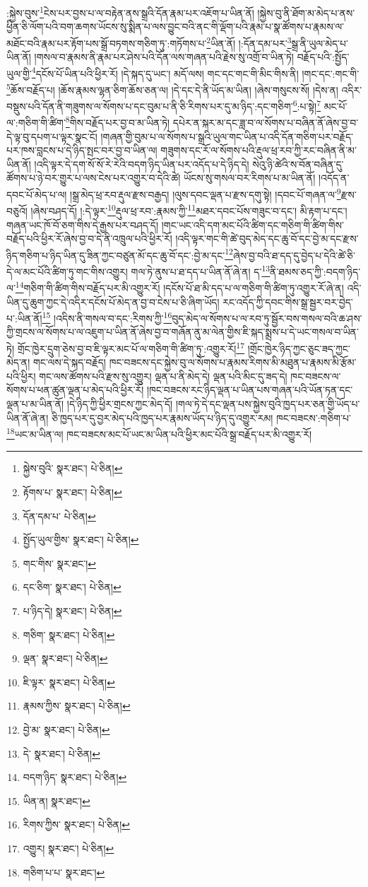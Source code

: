 :སྐྱེས་བུས་\footnote{སྐྱེས་བུའི་  སྣར་ཐང་།  པེ་ཅིན། }ངེས་པར་བྱས་པ་ལ་བརྟེན་ནས་སྒྲའི་དོན་རྣམ་པར་འཇོག་པ་ཡིན་ནོ། །སྐྱེས་བུ་ནི་ཐོག་མ་མེད་པ་ནས་ཕྱིན་ཅི་ལོག་པའི་བག་ཆགས་ཡོངས་སུ་སྨིན་པ་ལས་བྱུང་བའི་ནང་གི་ལྡོག་པའི་རྣམ་པ་སྣ་ཚོགས་པ་རྣམས་ལ་མཐོང་བའི་རྣམ་པར་རྟོག་པས་སྒྲོ་བཏགས་གཅིག་ཏུ་:གཏོགས་པ་\footnote{རྟོགས་པ་  སྣར་ཐང་།  པེ་ཅིན། }ཡིན་ནོ། །:དོན་དམ་པར་\footnote{དོན་དམ་པ་  པེ་ཅིན། }སྒྲ་ནི་ཡུལ་མེད་པ་ཡིན་ནོ། །གསལ་བ་རྣམས་ནི་རྣམ་པར་ཤེས་པའི་དོན་ལས་གཞན་པའི་རྗེས་སུ་འགྲོ་བ་ཡིན་ཏེ། བརྗོད་པའི་:སྤྱོད་ཡུལ་གྱི་\footnote{སྤྱོད་ཡུལ་གྱིས་  སྣར་ཐང་།  པེ་ཅིན། }དངོས་པོ་ཡིན་པའི་ཕྱིར་རོ། །དེ་སྐད་དུ་ཡང་། མདོ་ལས། གང་དང་གང་གི་མིང་གིས་ནི། །གང་དང་:གང་གི་\footnote{གང་གིས་  སྣར་ཐང་། }ཆོས་བརྗོད་པ། །ཆོས་རྣམས་ལྷན་ཅིག་ཆོས་ཅན་ལ། །དེ་དང་དེ་ནི་ཡོད་མ་ཡིན། །ཞེས་གསུངས་སོ། །དེས་ན། འདིར་བསྡུས་པའི་དོན་ནི་གཟུགས་ལ་སོགས་པ་དང་བུམ་པ་ནི་ཅི་རིགས་པར་དུ་མ་ཉིད་:དང་གཅིག་\footnote{དང་ཅིག་  སྣར་ཐང་།  པེ་ཅིན། }:པ་སྟེ།\footnote{པ་ཉིད་དེ།  སྣར་ཐང་།  པེ་ཅིན། } མང་པོ་ལ་:གཅིག་གི་ཚིག་\footnote{གཅིག་  སྣར་ཐང་།  པེ་ཅིན། }གིས་བརྗོད་པར་བྱ་བ་མ་ཡིན་ཏེ། དཔེར་ན་སྐར་མ་དང་ཟླ་བ་ལ་སོགས་པ་བཞིན་ནོ་ཞེས་བྱ་བ་དེ་ལྟ་བུ་དཔག་པ་ལྟར་སྣང་ངོ། །གཞན་གྱི་བུམ་པ་ལ་སོགས་པ་སྒྲའི་ཡུལ་གང་ཡིན་པ་འདི་དོན་གཅིག་པར་བརྗོད་པར་ཁས་བླངས་པ་དེ་ཉིད་སྤང་བར་བྱ་བ་ཡིན་ལ། གཟུགས་དང་རོ་ལ་སོགས་པའི་རྡུལ་ཕྲ་རབ་ཀྱི་རང་བཞིན་ནི་མ་ཡིན་ནོ། །འདི་ལྟར་དེ་དག་སོ་སོ་རེ་རེའི་བདག་ཉིད་ཡིན་པར་འདོད་པ་དེ་ཉིད་དེ། སེའུ་ཉི་ཚེའི་ས་བོན་བཞིན་དུ་ཚོགས་པ་ཉེ་བར་གྱུར་པ་ལས་ངེས་པར་འགྱུར་བ་དེའི་ཚེ། ཡོངས་སུ་གསལ་བར་རིགས་པ་མ་ཡིན་ནོ། །འདོད་ན་དབང་པོ་མེད་པ་ལ། །སྒྲ་མེད་ཕྲ་རབ་རྡུལ་རྫས་བརྒྱད། །ལུས་དབང་ལྡན་པ་རྫས་དགུ་སྟེ། །དབང་པོ་གཞན་ལ་\footnote{ལྡན་  སྣར་ཐང་།  པེ་ཅིན། }རྫས་བཅུའོ། །ཞེས་བཤད་དོ། །:དེ་ལྟར་\footnote{ཇི་ལྟར་  སྣར་ཐང་།  པེ་ཅིན། }རྡུལ་ཕྲ་རབ་:རྣམས་ཀྱི་\footnote{རྣམས་ཀྱིས་  སྣར་ཐང་།  པེ་ཅིན། }མཐར་དབང་པོས་གཟུང་བ་དང་། མི་རྟག་པ་དང་། གཞན་ཡང་ཁོ་བོ་ཅག་གིས་དེ་རྒྱས་པར་བཤད་དོ། །གང་ཡང་འདི་དག་མང་པོའི་ཚིག་དང་གཅིག་གི་ཚིག་གིས་བརྗོད་པའི་ཕྱིར་རོ་ཞེས་བྱ་བ་དེ་ནི་འཁྲུལ་པའི་ཕྱིར་རོ། །འདི་ལྟར་གང་གི་ཚེ་བུད་མེད་དང་ཆུ་བོ་དང་བྱེ་མ་དང་རྫས་ཉིད་གཅིག་པ་ཉིད་ཡིན་དུ་ཟིན་ཀྱང་བཙུན་མོ་དང་ཆུ་བོ་དང་:བྱེ་མ་དང་\footnote{བྱེ་མ་  སྣར་ཐང་།  པེ་ཅིན། }ཞེས་བྱ་བའི་ཐ་དད་དུ་བྱེད་པ་དེའི་ཚེ་ཅི་དེ་ལ་མང་པོའི་ཚིག་ཏུ་གང་གིས་འགྱུར། གལ་ཏེ་ནུས་པ་ཐ་དད་པ་ཡིན་ནོ་ཞེ་ན། ད་\footnote{དེ་  སྣར་ཐང་།  པེ་ཅིན། }ནི་ཐམས་ཅད་ཀྱི་:བདག་ཉིད་ལ་\footnote{བདག་ཉིད་  སྣར་ཐང་།  པེ་ཅིན། }གཅིག་གི་ཚིག་གིས་བརྗོད་པར་མི་འགྱུར་རོ། །དངོས་པོ་ཐ་མི་དད་པ་ལ་གཅིག་གི་ཚིག་ཏུ་འགྱུར་རོ་ཞེ་ན། འདི་ཡིན་དུ་ཆུག་ཀྱང་དེ་འདིར་དངོས་པོ་མེད་ན་བྱ་བ་ངེས་པ་ཅི་ཞིག་ཡོད། རང་འདོད་ཀྱི་དབང་གིས་སྒྲ་སྦྱར་བར་བྱེད་པ་:ཡིན་ནོ།\footnote{ཡིན་ན།  སྣར་ཐང་། } །འདིས་ནི་གསལ་བ་དང་:རིགས་ཀྱི་\footnote{རིགས་ཀྱིས་  སྣར་ཐང་།  པེ་ཅིན། }བུད་མེད་ལ་སོགས་པ་ལ་རབ་ཏུ་སྦྱོར་བས་གསལ་བའི་ཆ་ཤས་ཀྱི་གྲངས་ལ་སོགས་པ་ལ་འཇུག་པ་ཡིན་ནོ་ཞེས་བྱ་བ་གཞོན་ནུ་མ་ལེན་གྱིས་ཇི་སྐད་སྨྲས་པ་དེ་ཡང་གསལ་བ་ཡིན་ཏེ། གྲོང་ཁྱེར་དྲུག་ཅེས་བྱ་བ་ཇི་ལྟར་མང་པོ་ལ་གཅིག་གི་ཚིག་ཏུ་:འགྱུར་རོ།\footnote{འགྱུར།  སྣར་ཐང་།  པེ་ཅིན། } །གྲོང་ཁྱེར་ཉིད་ཀྱང་ཅུང་ཟད་ཀྱང་མེད་ན། གང་ལས་དེ་སྐད་བརྗོད། ཁང་བཟངས་དང་སྐྱེས་བུ་ལ་སོགས་པ་རྣམས་རིགས་མི་མཐུན་པ་རྣམས་མི་རྩོམ་པའི་ཕྱིར། གང་ལས་ཚོགས་པའི་རྫས་སུ་འགྱུར། ལྡན་པ་ནི་མེད་དེ། ལྡན་པའི་མིང་དུ་ཟད་དེ། ཁང་བཟངས་ལ་སོགས་པ་ཕན་ཚུན་ལྡན་པ་མེད་པའི་ཕྱིར་རོ། །ཁང་བཟངས་རང་ཉིད་ལྡན་པ་ཡིན་པས་གཞན་པའི་ཡོན་ཏན་དང་ལྡན་པ་མ་ཡིན་ནོ། །དེ་ཉིད་ཀྱི་ཕྱིར་གྲངས་ཀྱང་མེད་དོ། །གལ་ཏེ་དེ་དང་ལྡན་པས་སྐྱེས་བུའི་ཁྱད་པར་ཅན་གྱི་ཡོད་པ་ཡིན་ནོ་ཞེ་ན། ཅི་ཁྱད་པར་དུ་བྱར་མེད་པའི་ཁྱད་པར་རྣམས་ཡོད་པ་ཉིད་དུ་འགྱུར་རམ། ཁང་བཟངས་:གཅིག་པ་\footnote{གཅིག་པ་པ་  སྣར་ཐང་། }ཡང་མ་ཡིན་ལ། ཁང་བཟངས་མང་པོ་ཡང་མ་ཡིན་པའི་ཕྱིར་མང་པོའི་སྒྲ་བརྗོད་པར་མི་འགྱུར་རོ། 